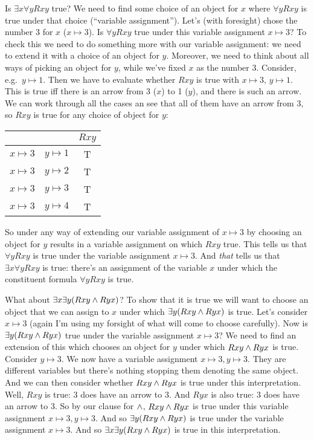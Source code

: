  Is $\exists x\forall y Rxy$ true? We need to find some choice of an object for $x$ where $\forall y Rxy$ is true under that choice (``variable assignment''). Let's (with foresight) chose the number 3 for $x$ ($x\mapsto 3$). Is $\forall y Rxy$ true under this variable assignment $x\mapsto 3$? To check this we need to do something more with our variable assignment: we need to extend it with a choice of an object for $y$. Moreover, we need to think about all ways of picking an object for $y$, while we've fixed $x$ as the number 3. Consider, e.g.~$y\mapsto 1$. Then we have to evaluate whether $Rxy$ is true with $x\mapsto 3,\, y\mapsto 1$. This is true iff there is an arrow from 3 ($x$) to 1 ($y$), and there is such an arrow.  We can work through all the cases an see that all of them have an arrow from $3$, so $Rxy$ is true for any choice of object for $y$:
\begin{center}
 \begin{tabular}{cc|c}
&&$Rxy$\Bstrut\\\hline\Tstrut
$x\mapsto 3$&$y\mapsto 1$&T\\
$x\mapsto 3$&$y\mapsto 2$&T\\
$x\mapsto 3$&$y\mapsto 3$&T\\
$x\mapsto 3$&$y\mapsto 4$&T\\
 \end{tabular}
\end{center}So under any way of extending our variable assignment of $x\mapsto 3$ by choosing an object for $y$ results in a variable assignment on which $Rxy$ true. This tells us that $\forall y Rxy$ is true under the variable assignment $x\mapsto 3$. And \emph{that} tells us that $\exists x\forall y Rxy$ is true: there's an assignment of the variable $x$ under which the constituent formula $\forall y Rxy$ is true. 

What about $\exists x \exists y(Rxy \wedge Ryx)$? To show that it is true we will want to choose an object that we can assign to $x$ under which $\exists y (Rxy\wedge Ryx)$ is true. Let's consider $x\mapsto 3$ (again I'm using my forsight of what will come to choose carefully). Now is $\exists y (Rxy\wedge Ryx)$  true under the variable assignment $x\mapsto 3$? We need to find an extension of this which chooses an object for $y$ under which $Rxy\wedge Ryx$ is true. Consider $y\mapsto 3$. We now have a variable assignment $x\mapsto 3, y\mapsto 3$. They are different variables but there's nothing stopping them denoting the same object. And we can then consider whether $Rxy\wedge Ryx$ is true under this interpretation. Well, $Rxy$ is true: 3 does have an arrow to 3. And $Ryx$ is also true: 3 does have an arrow to 3. So by our clause for $\wedge$, $Rxy\wedge Ryx$ is true under this variable assignment $x\mapsto 3, y\mapsto 3$. And so $\exists y(Rxy\wedge Ryx)$ is true under the variable assignment $x\mapsto 3$. And so $\exists x\exists y(Rxy\wedge Ryx)$ is true in this interpretation. 

